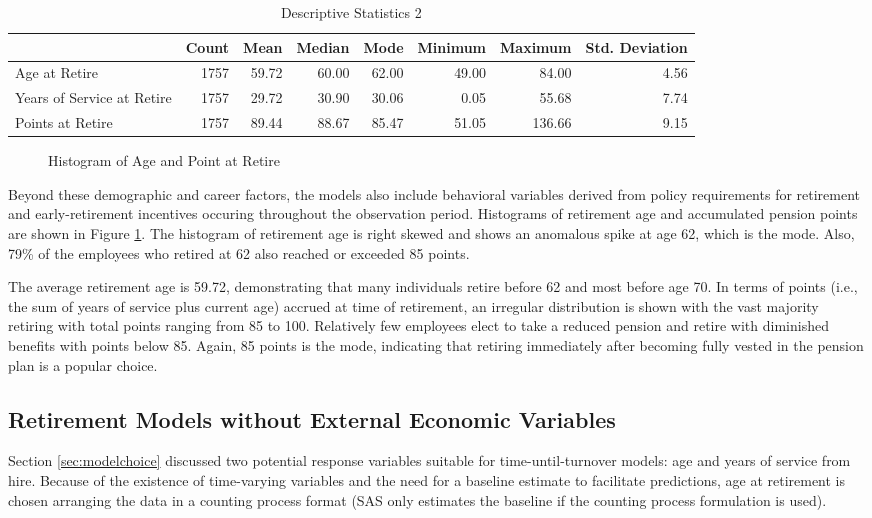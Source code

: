 \begin{table}[htbp]
	\centering
	\scriptsize
	\caption{Descriptive Statistics 2}
	\begin{tabular}{lrrrrrrr}
		\toprule
		& Count & Mean  & Median & Mode  & Minimum & Maximum & Std. Deviation \\
		\midrule
		\multicolumn{1}{l}{Age at Retire} & 1757  & 59.72 & 60.00 & 62.00 & 49.00 & 84.00 & 4.56 \\
		\multicolumn{1}{l}{Years of Service at Retire} & 1757  & 29.72 & 30.90 & 30.06 & 0.05  & 55.68 & 7.74 \\
		\multicolumn{1}{l}{Points at Retire} & 1757  & 89.44 & 88.67 & 85.47 & 51.05 & 136.66 & 9.15 \\
		\bottomrule
	\end{tabular}%
	\label{tab:descrip2}%
\end{table}%

\begin{figure}[h!]
	\centering
	\caption{Histogram of Age and Point at Retire}
	\label{fig:hist}
\end{figure}

Beyond these demographic and career factors, the models also include behavioral variables derived from policy requirements for retirement and early-retirement incentives occuring throughout the observation period. Histograms of retirement age and accumulated pension points are shown in Figure \ref{fig:hist}. The histogram of retirement age is right skewed and shows an anomalous spike at age 62, which is the mode. Also, 79\% of the employees who retired at 62 also reached or exceeded 85 points.

The average retirement age is 59.72, demonstrating that many individuals retire before 62 and most before age 70. In terms of points (i.e., the sum of years of service plus current age) accrued at time of retirement, an irregular distribution is shown with the vast majority retiring with total points ranging from 85 to 100. Relatively few  employees elect to take a reduced pension and retire with diminished benefits with points below 85. Again, 85 points is the mode, indicating that retiring immediately after becoming fully vested in the pension plan is a popular choice.

\subsection{Retirement Models without External Economic Variables}
Section \ref{sec:modelchoice} discussed two potential response variables suitable for time-until-turnover models: age and years of service from hire. Because of the existence of time-varying variables and the need for a baseline estimate to facilitate predictions, age at retirement is chosen arranging the data in a counting process format (SAS only estimates the baseline if the counting process formulation is used).

